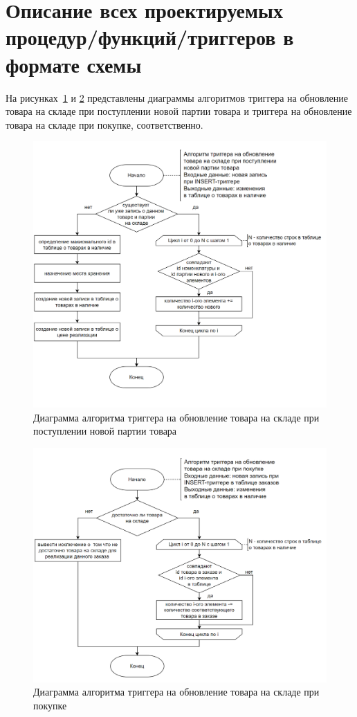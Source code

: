 \section{Описание всех проектируемых процедур/функций/триггеров в формате схемы}
На рисунках~\ref{fig:trigger1} и \ref{fig:trigger2} представлены диаграммы алгоритмов триггера на обновление товара на складе при поступлении новой партии товара и триггера на обновление товара на складе при покупке, соответственно.
\begin{figure}
	\centering
	\includegraphics[width=1\linewidth]{pictures/trigger_1_load_batch}
	\caption{Диаграмма алгоритма триггера на обновление товара на складе при поступлении новой партии товара}
	\label{fig:trigger1}
\end{figure}
\begin{figure}
	\centering
	\includegraphics[width=1\linewidth]{pictures/trigger_2_make_purchase}
	\caption{Диаграмма алгоритма триггера на обновление товара на складе при покупке}
	\label{fig:trigger2}
\end{figure}
